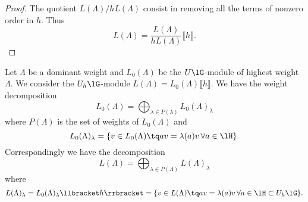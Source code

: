 \begin{proof}
	The quotient \( L(\Lambda)/hL(\Lambda)\) consist in removing all the terms of nonzero order in \( h\). Thus
	\begin{equation}
		L(\Lambda)=\frac{ L(\Lambda) }{ hL(\Lambda) }\llbracket h\rrbracket.
	\end{equation}

\end{proof}

\begin{proposition}
	Let \( \Lambda\) be a dominant weight and \( L_0(\Lambda)\) be the \( U\lG\)-module of highest weight \( \Lambda\). We consider the \( U_h\lG\)-module \( L(\Lambda)=L_0(\Lambda)\llbracket h\rrbracket\). We have the weight decomposition
	\begin{equation}
		L_0(\Lambda)=\bigoplus_{\lambda\in P(\lambda)}L_0(\Lambda)_{\lambda}
	\end{equation}
	where \( P(\Lambda)\) is the set of weights of \( L_0(\Lambda)\) and
	\begin{equation}
		L_0(\Lambda)_{\lambda}=\{ v\in L_0(\Lambda)\tq av=\lambda(a)v\,\forall a\in\lH \}.
	\end{equation}
	Correspondingly we have the decomposition
	\begin{equation}
		L(\Lambda)=\bigoplus_{\lambda\in P(\Lambda)}L(\Lambda)_{\lambda}
	\end{equation}
	where
	\begin{equation}
		L(\Lambda)_{\lambda}=L_0(\Lambda)_{\lambda}\llbracket h\rrbracket=\{ v\in L(\Lambda)\tq av=\lambda(a)v\,\forall a\in\lH\subset U_h\lG \}.
	\end{equation}

\end{proposition}

